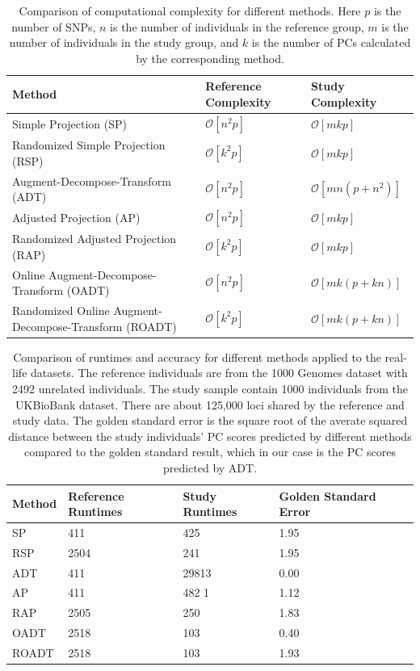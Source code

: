 \documentclass{article}
\newcommand{\bO}{\mathcal{O}}
\begin{document}
\begin{table} 
  \centering
  \begin{tabular}{|l|l|l|}
    \hline
    Method & Reference Complexity & Study Complexity \\ 
    \hline
    Simple Projection (SP) & $\bO[n^2p]$ & $\bO[mkp]$ \\
    \hline
    Randomized Simple Projection (RSP) & $\bO[k^2p]$ & $\bO[mkp]$ \\
    \hline
    Augment-Decompose-Transform (ADT) & $\bO[n^2 p]$ & $\bO[mn(p + n^2)]$ \\
    \hline
    Adjusted Projection (AP) & $\bO[n^2p]$ &  $\bO[mkp]$ \\
    \hline
    Randomized Adjusted Projection (RAP) & $\bO[k^2p]$ &  $\bO[mkp]$ \\
    \hline
    Online Augment-Decompose-Transform (OADT) & $\bO[n^2 p]$ & $\bO[mk(p + k n)]$ \\
    \hline
    Randomized Online Augment-Decompose-Transform (ROADT) & $\bO[k^2 p]$ & $\bO[mk(p + k n)]$ \\
    \hline
  \end{tabular}
  \caption{
    Comparison of computational complexity for different methods.
    Here $p$ is the number of SNPs,
    $n$ is the number of individuals in the reference group,
    $m$ is the number of individuals in the  study group,
    and $k$ is the number of PCs calculated by the corresponding method.
  }
  \label{tbl:cplx}
\end{table}

\begin{table} 
  \centering
  \begin{tabular}{|l|l|l|l|l|}
    \hline
    Method & Reference Runtimes & Study Runtimes & Golden Standard Error \\ 
    \hline
    SP & 411 & 425 & 1.95 \\
    \hline
    RSP & 2504 & 241 & 1.95 \\
    \hline
    ADT & 411 & 29813 & 0.00 \\
    \hline
    AP & 411 & 482 1 & 1.12 \\
    \hline
    RAP & 2505 & 250 & 1.83 \\ 
    \hline
    OADT & 2518 & 103 & 0.40 \\
    \hline
    ROADT & 2518 & 103 & 1.93 \\
    \hline
  \end{tabular}
  \caption{
    Comparison of runtimes and accuracy for different methods applied to the real-life datasets.
    The reference individuals are from the 1000 Genomes dataset with 2492 unrelated individuals.
    The study sample contain 1000 individuals from the UKBioBank dataset.
    There are about 125,000 loci shared by the reference and study data.
    The golden standard error is the square root of the averate squared distance between the study individuals' PC scores predicted by different methods compared to the golden standard result, which in our case is the PC scores predicted by ADT.
  }
  \label{tbl:ukb}
\end{table}
\end{document}
